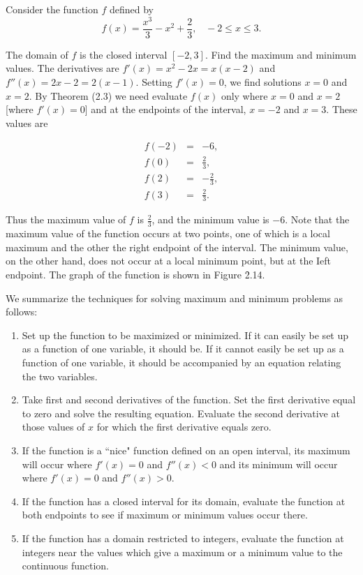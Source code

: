 \begin{example}
\label{exam 2.2.4}
Consider the function $f$ defined by
$$
f(x) = \frac{x^3}{3} - x^2 + \frac{2}{3},  \;\;\; -2 \leq x \leq 3.
$$

\noindent The domain of $f$ is the closed interval $[-2, 3]$. Find the maximum and minimum values. The derivatives are $f'(x) = x^2 - 2x = x(x - 2)$ and $f''(x) = 2x - 2 = 2(x - 1)$. Setting $f'(x) = 0$, we find solutions $x = 0$ and $x = 2$. By Theorem (2.3) we need evaluate $f(x)$ only where $x = 0$ and $x = 2$ [where $f'(x) = 0$] and at the endpoints of the interval, $x = -2$ and $x = 3$. These values are

\begin{eqnarray*}
f(-2) &=& -6,\\
f(0) &=& \frac{2}{3}, \\
f(2) &=& - \frac{2}{3},\\
f(3) &=& \frac{2}{3}.
\end{eqnarray*}

\noindent Thus the maximum value of $f$ is $\frac{2}{3}$, and the minimum value is $-6$. Note that the maximum value of the function occurs at two points, one of which is a local maximum and the other the right endpoint of the interval. The minimum
value, on the other hand, does not occur at a local minimum point, but at the Ieft endpoint. The graph of the function is shown in Figure \f{2.14}.
\end{example}


We summarize the techniques for solving maximum and minimum problems as follows:

\begin{enumerate}
\item Set up the function to be maximized or minimized. If it can easily be set up as a function of one variable, it should be. If it cannot easily be set up as a function of one variable, it should be accompanied by an equation relating the two variables.

\item Take first and second derivatives of the function. Set the first derivative equal to zero and solve the resulting equation. Evaluate the second derivative at those values of $x$ for which the first derivative equals zero.


\item If the function is a ``nice" function defined on an open interval, its maximum will occur where $f'(x) = 0$ and $f''(x) < 0$ and its minimum will occur where $f'(x) = 0$ and $f''(x) > 0$.


\item If the function has a closed interval for its domain, evaluate the function at both endpoints to see if maximum or minimum values occur there.


\item If the function has a domain restricted to integers, evaluate the function at integers near the values which give a maximum or a minimum value to the continuous function.
\end{enumerate}
 
